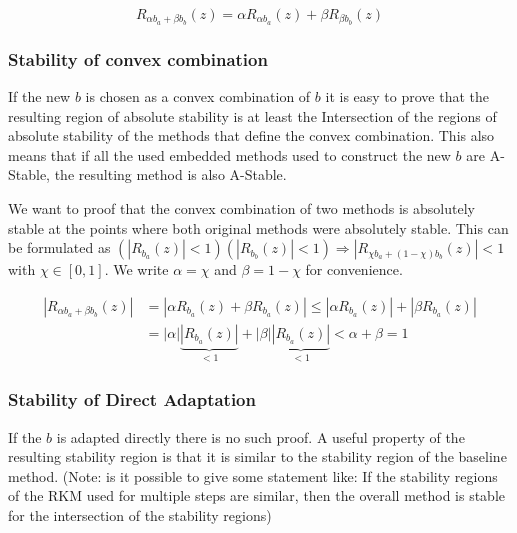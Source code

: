 \documentclass[a4paper]{scrartcl}
\numberwithin{equation}{section}
\theoremstyle{plain}
\theoremstyle{definition}
\numberwithin{theorem}{section}
\newcommand{\1}{\mathbbm{1}}
\begin{document}
\begin{equation}
R_{\alpha b_a+\beta b_b}(z) = \alpha R_{\alpha b_a}(z) + \beta R_{\beta b_b}(z) 
\end{equation}




\subsubsection{Stability of convex combination}
If the new $b$ is chosen as a convex combination of $b$ it is easy to prove that the resulting region of absolute stability is at least the Intersection of the regions of absolute stability of the methods that define the convex combination. This also means that if all the used embedded methods used to construct the new $b$ are A-Stable, the resulting method is also A-Stable.

We want to proof that the convex combination of two methods is absolutely stable at the points where both original methods were absolutely stable.
This can be formulated as $(|R_{b_a}(z)|  < 1) (|R_{b_b}(z)| < 1) \Rightarrow |R_{\chi b_a +(1- \chi) b_b}(z)| < 1$ with $\chi \in [0,1]$.
We write $\alpha = \chi$ and $\beta = 1-\chi$ for convenience.

\begin{align}
|R_{\alpha b_a +\beta b_b}(z)| &= |\alpha R_{b_a}(z) + \beta R_{b_a}(z)| \leq |\alpha R_{b_a}(z)| + |\beta R_{b_a}(z)|\\
 &=| \alpha| \underbrace{|R_{b_a}(z)|}_{<1} + |\beta| \underbrace{|R_{b_a}(z)|}_{<1} < \alpha + \beta = 1
\end{align}



\subsubsection{Stability of  Direct Adaptation}
If the $b$ is adapted directly there is no such proof.
A useful property of the resulting stability region is that it is similar to the stability region of the baseline method. 
(Note: is it possible to give some statement like: If the stability regions of the RKM used for multiple steps are similar, then the overall method is stable for the intersection of the stability regions)
\end{document}

